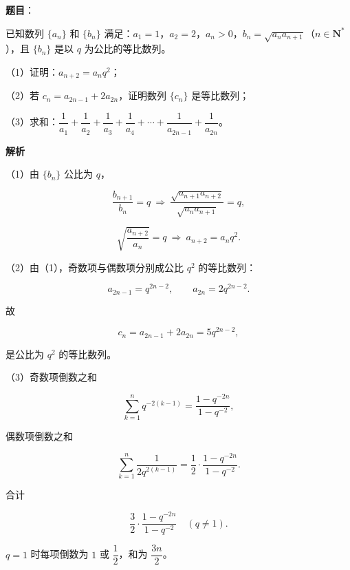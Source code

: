 \begin{answer}

\textbf{题目}：

已知数列 $\{a_n\}$ 和 $\{b_n\}$ 满足：$a_1=1$，$a_2=2$，$a_n>0$，$b_n=\sqrt{a_na_{n+1}}$（$n\in\mathbf N^*$），且 $\{b_n\}$ 是以 $q$ 为公比的等比数列。

（1）证明：$a_{n+2}=a_nq^2$；

（2）若 $c_n=a_{2n-1}+2a_{2n}$，证明数列 $\{c_n\}$ 是等比数列；

（3）求和：$\dfrac1{a_1}+\dfrac1{a_2}+\dfrac1{a_3}+\dfrac1{a_4}+\cdots+\dfrac1{a_{2n-1}}+\dfrac1{a_{2n}}$。

\textbf{解析}

（1）由 $\{b_n\}$ 公比为 $q$，

\nopagebreak[4]
\[\frac{b_{n+1}}{b_n}=q\ \Rightarrow\ \frac{\sqrt{a_{n+1}a_{n+2}}}{\sqrt{a_na_{n+1}}}=q,\]

\nopagebreak[4]
\[\sqrt{\frac{a_{n+2}}{a_n}}=q\ \Rightarrow\ a_{n+2}=a_nq^2.\]

（2）由（1），奇数项与偶数项分别成公比 $q^2$ 的等比数列：

\nopagebreak[4]
\[a_{2n-1}=q^{2n-2},\qquad a_{2n}=2q^{2n-2}.\]

故

\nopagebreak[4]
\[c_n=a_{2n-1}+2a_{2n}=5q^{2n-2},\]

是公比为 $q^2$ 的等比数列。

（3）奇数项倒数之和

\nopagebreak[4]
\[\sum_{k=1}^n q^{-2(k-1)}=\frac{1-q^{-2n}}{1-q^{-2}},\]

偶数项倒数之和

\nopagebreak[4]
\[\sum_{k=1}^n\frac1{2q^{2(k-1)}}=\frac12\cdot\frac{1-q^{-2n}}{1-q^{-2}}.\]

合计

\nopagebreak[4]
\[\frac32\cdot\frac{1-q^{-2n}}{1-q^{-2}}\quad(q\neq1).\]

$q=1$ 时每项倒数为 $1$ 或 $\dfrac12$，和为 $\dfrac{3n}2$。


\end{answer}
